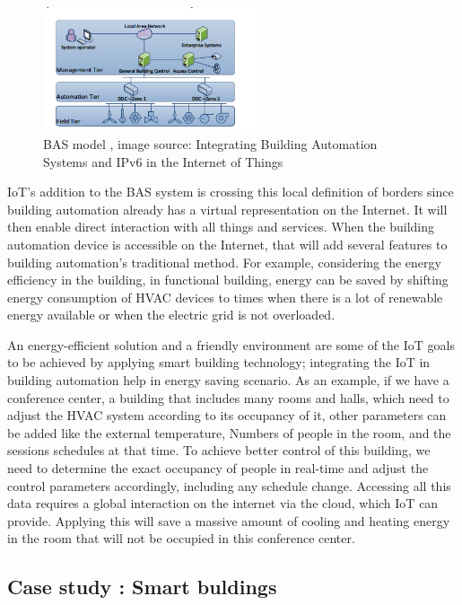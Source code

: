 \documentclass[conference]{IEEEtran}
\begin{document}
\begin{figure}[h!]
	\centering
	\includegraphics[width=2.5in]{newIOt.png}
	\caption{\label{neu}  BAS  model
		, image source: Integrating Building Automation Systems and IPv6
in the Internet of Things
		\cite{NewIOT} }
\end{figure}



IoT's addition to the BAS system is crossing this local definition of borders since building automation already has a virtual representation on the Internet. It will then enable direct interaction with all things and services. When the building automation device is accessible on the Internet, that will add several features to building automation's traditional method. For example, considering the energy efficiency in the building, in functional building\cite{NewIOT}, energy can be saved by shifting energy consumption of HVAC devices to times when there is a lot of renewable energy available or when the electric grid is not overloaded. 




An energy-efficient solution and a friendly environment are some of the IoT goals to be achieved by applying smart building technology; integrating the IoT in building automation help in energy saving scenario. As an example\cite{NewIOT}, if we have a conference center, a building that includes many rooms and halls, which need to adjust the HVAC system according to its occupancy of it, other parameters can be added like the external temperature, Numbers of people in the room, and the sessions schedules at that time. To achieve better control of this building, we need to determine the exact occupancy of people in real-time and adjust the control parameters accordingly, including any schedule change. Accessing all this data requires a global interaction on the internet via the cloud, which IoT can provide. Applying this will save a massive amount of cooling and heating energy in the room that will not be occupied in this conference center. 


\subsection{Case study : Smart buldings}
\end{document}
